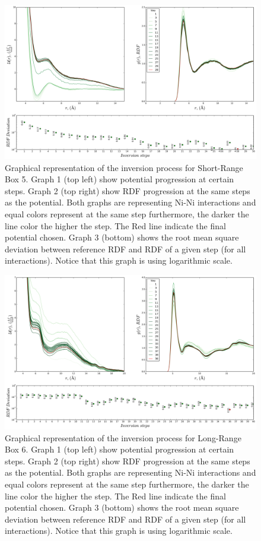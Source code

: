 \documentclass[10pt,a4paper,twoside]{article}
\begin{document}
\begin{figure}[H]
  \begin{center}
	\includegraphics[width=.8 \textwidth]{./graphs/Conv45sC}
	\caption{\small{Graphical representation of the inversion process for Short-Range Box 5. Graph 1 (top left) show potential progression at certain steps. Graph 2 (top right) show RDF progression at the same steps as the potential. Both graphs are representing Ni-Ni interactions and equal colors represent at the same step furthermore, the darker the line color the higher the step. The Red line indicate the final potential chosen.  Graph 3 (bottom) shows the root mean square deviation between reference RDF and RDF of a given step (for all interactions). Notice that this graph is using logarithmic scale.}}
	\label{Fig:Conv45sC}
  \end{center}
\end{figure}

\begin{figure}[H]
  \begin{center}
	\includegraphics[width=.8 \textwidth]{./graphs/Conv100sC}
	\caption{\small{Graphical representation of the inversion process for Long-Range Box 6. Graph 1 (top left) show potential progression at certain steps. Graph 2 (top right) show RDF progression at the same steps as the potential. Both graphs are representing Ni-Ni interactions and equal colors represent at the same step furthermore, the darker the line color the higher the step. The Red line indicate the final potential chosen.  Graph 3 (bottom) shows the root mean square deviation between reference RDF and RDF of a given step (for all interactions). Notice that this graph is using logarithmic scale.}}
	\label{Fig:Conv100sC}
  \end{center}
\end{figure}
\end{document}
